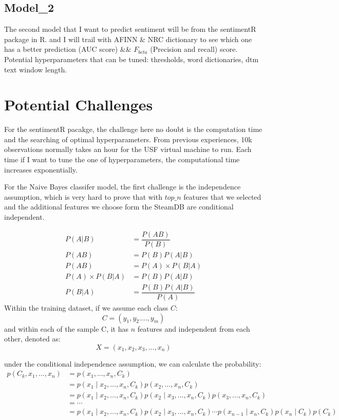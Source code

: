 \documentclass[11pt]{scrartcl}
\begin{document}
    \subsection*{Model\_2}
    The second model that I want  to predict sentiment will be from the sentimentR package in R. and I will trail with AFINN \& NRC dictionary to see which one has a better prediction (AUC score) \&\& $F_{beta}$ (Precision and recall) score. Potential hyperparameters that can be tuned: thresholds, word dictionaries, dtm text window length. 
    
    




\section*{Potential Challenges}

For the sentimentR pacakge, the challenge here no doubt is the computation time and the searching of optimal hyperparameters. From previous experiences, 10k observations normally takes an hour for the USF virtual machine to run. Each time if I want to tune the one of hyperparameters, the computational time increases exponentially.


For the Naive Bayes classifer model, the first challenge is the independence assumption, which is very hard to prove that with $top\_n$ features that we selected and the additional features we choose form the SteamDB are conditional independent. 

\begin{align*} 
  P(A|B) &=  \dfrac{P(AB)}{P(B)} \\ 
  P(AB) &=  P(B)P(A|B) \\ 
  P(AB) &= P(A) \times P(B|A) \\
  P(A) \times P(B|A) &= P(B)P(A|B) \\ 
  P(B|A) &= \dfrac{P(B)P(A|B)}{P(A)}
\end{align*}
Within the training dataset, if we assume each class $C$: 
$$C = (y_1, y_2...., y_{m})$$
and within each of the sample C, it has $n$ features and independent from each other, denoted as: 
$$ X = (x_1, x_2, x_3, ..., x_n)$$

under the conditional independence assumption, we can calculate the probability:
$$
\begin{aligned}
p\left(C_{k}, x_{1}, \ldots, x_{n}\right) &=p\left(x_{1}, \ldots, x_{n}, C_{k}\right) \\
&=p\left(x_{1} \mid x_{2}, \ldots, x_{n}, C_{k}\right) p\left(x_{2}, \ldots, x_{n}, C_{k}\right) \\
&=p\left(x_{1} \mid x_{2}, \ldots, x_{n}, C_{k}\right) p\left(x_{2} \mid x_{3}, \ldots, x_{n}, C_{k}\right) p\left(x_{3}, \ldots, x_{n}, C_{k}\right) \\
&=\cdots \\
&=p\left(x_{1} \mid x_{2}, \ldots, x_{n}, C_{k}\right) p\left(x_{2} \mid x_{3}, \ldots, x_{n}, C_{k}\right) \cdots p\left(x_{n-1} \mid x_{n}, C_{k}\right) p\left(x_{n} \mid C_{k}\right) p\left(C_{k}\right)
\end{aligned}
$$
\end{document}
